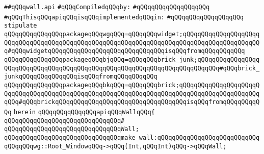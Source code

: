 \label{src/lib/x-kit/tut/badbricks-game/wall.api}
\verb|##qQQqwall.api|\newline
\newline
\verb|#qQQqCompiledqQQqby:|\newline
\verb|#qQQqqQQqqQQqqQQqqQQq|\newline
\newline
\verb|#qQQqThisqQQqapiqQQqisqQQqimplementedqQQqin:|\newline
\verb|#qQQqqQQqqQQqqQQqqQQq|\newline
\newline
\verb|stipulate|\newline
\verb|qQQqqQQqqQQqqQQqpackageqQQqwgqQQq=qQQqqQQqwidget;qQQqqQQqqQQqqQQqqQQqqQQqqQQqqQQqqQQqqQQqqQQqqQQqqQQqqQQqqQQqqQQqqQQqqQQqqQQqqQQqqQQqqQQqqQQq#qQQqwidgetqQQqqQQqqQQqqQQqqQQqqQQqqQQqqQQqisqQQqfromqQQqqQQqqQQq|\newline
\verb|qQQqqQQqqQQqqQQqpackageqQQqbjqQQq=qQQqqQQqbrick_junk;qQQqqQQqqQQqqQQqqQQqqQQqqQQqqQQqqQQqqQQqqQQqqQQqqQQqqQQqqQQqqQQqqQQqqQQqqQQq#qQQqbrick_junkqQQqqQQqqQQqqQQqisqQQqfromqQQqqQQqqQQq|\newline
\verb|qQQqqQQqqQQqqQQqpackageqQQqbkqQQq=qQQqqQQqbrick;qQQqqQQqqQQqqQQqqQQqqQQqqQQqqQQqqQQqqQQqqQQqqQQqqQQqqQQqqQQqqQQqqQQqqQQqqQQqqQQqqQQqqQQqqQQqqQQq#qQQqbrickqQQqqQQqqQQqqQQqqQQqqQQqqQQqqQQqqQQqisqQQqfromqQQqqQQqqQQq|\newline
\verb|herein|\newline
\newline
\verb|qQQqqQQqqQQqqQQqapiqQQqWallqQQq{|\newline
\verb|qQQqqQQqqQQqqQQqqQQqqQQqqQQqqQQq#|\newline
\verb|qQQqqQQqqQQqqQQqqQQqqQQqqQQqqQQqWall;|\newline
\newline
\verb|qQQqqQQqqQQqqQQqqQQqqQQqqQQqqQQqmake_wall:qQQqqQQqqQQqqQQqqQQqqQQqqQQqqQQqqQQqwg::Root_WindowqQQq->qQQq(Int,qQQqInt)qQQq->qQQqWall;|\newline
\newline
